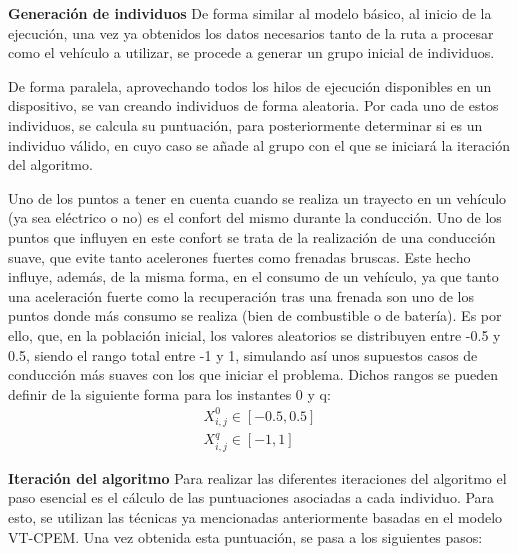 \documentclass[11pt,spanish,listoffigures,listoftables]{tfgetsinf}
\begin{document}
\noindent\textbf{Generación de individuos}\newline
De forma similar al modelo básico, al inicio de la ejecución, una vez ya obtenidos los datos necesarios tanto de la ruta a procesar como el vehículo a utilizar, se procede a generar un grupo inicial de individuos.

De forma paralela, aprovechando todos los hilos de ejecución disponibles en un dispositivo, se van creando individuos de forma aleatoria. Por cada uno de estos individuos, se calcula su puntuación, para posteriormente determinar si es un individuo válido, en cuyo caso se añade al grupo con el que se iniciará la iteración del algoritmo.

Uno de los puntos a tener en cuenta cuando se realiza un trayecto en un vehículo (ya sea eléctrico o no) es el confort del mismo durante la conducción. Uno de los puntos que influyen en este confort se trata de la realización de una conducción suave, que evite tanto acelerones fuertes como frenadas bruscas. Este hecho influye, además, de la misma forma, en el consumo de un vehículo, ya que tanto una aceleración fuerte como la recuperación tras una frenada son uno de los puntos donde más consumo se realiza (bien de combustible o de batería). Es por ello, que, en la población inicial, los valores aleatorios se distribuyen entre -0.5 y 0.5, siendo el rango total entre -1 y 1, simulando así unos supuestos casos de conducción más suaves con los que iniciar el problema. Dichos rangos se pueden definir de la siguiente forma para los instantes 0 y q:
\begin{align*}
    X_{i,j}^{0} \in [-0.5, 0.5] \\
    X_{i,j}^{q} \in [-1, 1]
\end{align*}

\noindent\textbf{Iteración del algoritmo}\newline
Para realizar las diferentes iteraciones del algoritmo el paso esencial es el cálculo de las puntuaciones asociadas a cada individuo. Para esto, se utilizan las técnicas ya mencionadas anteriormente basadas en el modelo VT-CPEM. Una vez obtenida esta puntuación, se pasa a los siguientes pasos:
\end{document}
